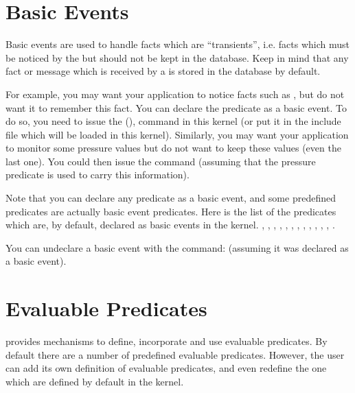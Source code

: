 \section{Basic Events}

Basic events are used to handle facts which are ``transients'', i.e. facts
which must be noticed by the \CPK{} but should not be kept in the
database. Keep in mind that any fact or message which is received by a
\CPK{} is stored in the database by default.

For example, you may want your application to notice facts such as
, but do not want it to remember this fact. You can declare
the  predicate as a basic event. To do so, you need to issue
the  (),
command in this kernel (or put it in the include file which will be loaded
in this kernel). Similarly, you may want your application to monitor some
pressure values but do not want to keep these values (even the last one).
You could then issue the command  (assuming that
the pressure predicate is used to carry this information).

Note that you can declare any predicate as a basic event, and some
predefined predicates are actually basic event predicates.
Here is the list of the predicates which are, by default, declared as
basic events in the kernel. \*
, \*
, \*
, \*
, \*
, \*
,
, \*
, \*
, \*
, \*
, \*
, \*
.

You can undeclare a basic event with the command: 
(assuming it was declared as a basic event).

\section{Evaluable Predicates}

\COPRS{} provides mechanisms to define, incorporate and use evaluable
predicates. By default there are a number of predefined
evaluable predicates. However, the user can add its own
definition of evaluable predicates, and even redefine the
one which are defined by default in the kernel.

